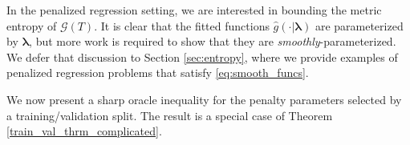 \documentclass[12pt]{article}
\begin{document}
In the penalized regression setting, we are interested in bounding the metric entropy of $\mathcal{G}(T)$. It is clear that the fitted functions $\hat{g}(\cdot | \boldsymbol \lambda)$ are parameterized by $\boldsymbol \lambda$, but more work is required to show that they are \textit{smoothly}-parameterized. We defer that discussion to Section \ref{sec:entropy}, where we provide examples of penalized regression problems that satisfy \ref{eq:smooth_funcs}.

We now present a sharp oracle inequality for the penalty parameters selected by a training/validation split. The result is a special case of Theorem \ref{train_val_thrm_complicated}.


\end{document}
